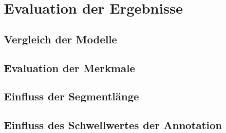 \chapter{Evaluation der Ergebnisse}

	\section{Vergleich der Modelle}
	
	\section{Evaluation der Merkmale}

	\section{Einfluss der Segmentlänge}

	\section{Einfluss des Schwellwertes der Annotation}